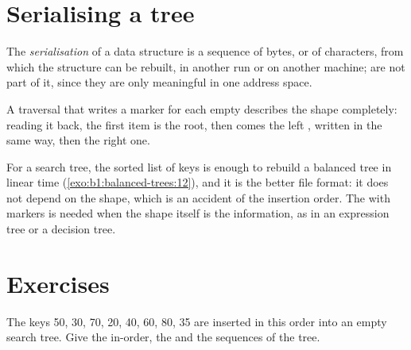 \section{Serialising a tree}\label{sec:b1:balanced-trees:serialisation}

\begin{definition}[Serialisation]\label{def:b1:balanced-trees:serialisation}
The \emph{serialisation} of a data structure is a sequence of bytes, or of
characters, from which the structure can be rebuilt, in another run or on another machine;  are not part of it,
since they are only meaningful in one address space.
\end{definition}

A  traversal that writes a marker for each empty  describes the shape completely: reading it back, the
first item is the root, then comes the left , written in the same way, then the right one.

\label{lst:b1:balanced-trees:serialise}

\label{out:b1:balanced-trees:serialise}

\begin{inpractice}
For a search tree, the sorted list of keys is enough to rebuild a balanced tree in linear time
(\cref{exo:b1:balanced-trees:12}), and it is the better file format: it does not depend on the shape, which is an
accident of the insertion order. The  with markers is needed when the shape itself is the information, as in an
expression tree or a decision tree.
\end{inpractice}

\section{Exercises}\label{sec:b1:balanced-trees:exercises}

\begin{exercise}[$\star$]\label{exo:b1:balanced-trees:1}
The keys 50, 30, 70, 20, 40, 60, 80, 35 are inserted in this order into an empty search tree. Give the in-order, the
 and the  sequences of the tree.
\end{exercise}

